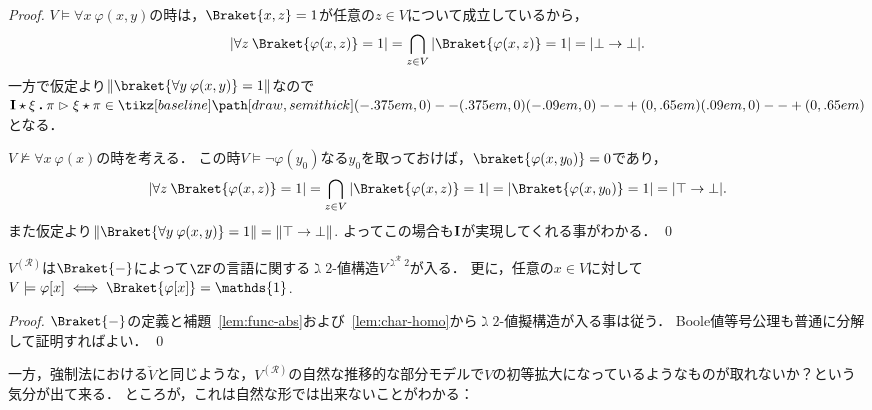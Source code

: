 \documentclass[realisability.tex]{subfiles}
\begin{document}
\begin{proof}
 $V \models \forall x \: \varphi(x, y)$の時は，$\Braket{x, z} = 1$が任意の$z \in V$について成立しているから，
 \[
 \left|\forall z \: \Braket{\varphi(x,z)} = 1\right| = \bigcap_{z \in V} \left|\Braket{\varphi(x, z)} = 1\right| = | \bot \to \bot |.
 \]
 一方で仮定より$\|\braket{\forall y \: \varphi(x, y)} = 1\|$なので$\comb{I} \cons \xi \push \pi \reds \xi \cons \pi \in \pole$となる．

 $V \not\models \forall x \: \varphi(x)$の時を考える．
 この時$V \models \neg \varphi(y_0)$なる$y_0$を取っておけば，$\braket{\varphi(x, y_0)} = 0$であり，
 \[
 \left|\forall z \: \Braket{\varphi(x,z)} = 1\right| = \bigcap_{z \in V} \left|\Braket{\varphi(x, z)} = 1\right| = |\Braket{\varphi(x, y_0)} = 1| = | \top \to \bot |.
 \]
 また仮定より$\|\Braket{\forall y\: \varphi(x, y)} = 1\| = \|\top \to \bot\|$.
 よってこの場合も$\mathsf{\mathbf{I}}$が実現してくれる事がわかる． \qed
\end{proof}

\begin{corollary}
 $V^{(\mathcal{R})}$は$\Braket{-}$によって$\ZF$の言語に関する$\gimel 2$-値構造$V^{\gimel^{\mathcal{R}} 2}$が入る．
 更に，任意の$x \in V$に対して$V \models \varphi[x] \iff \Braket{\varphi[x]} = \mathds{1}$.
\end{corollary}
\begin{proof}
 $\Braket{-}$の定義と補題~\ref{lem:func-abs}および~\ref{lem:char-homo}から$\gimel 2$-値擬構造が入る事は従う．
 Boole値等号公理も普通に分解して証明すればよい． \qed
\end{proof}

一方，強制法における$\check{V}$と同じような，$V^{(\mathcal{R})}$の自然な推移的な部分モデルで$V$の初等拡大になっているようなものが取れないか？という気分が出て来る．
ところが，これは自然な形では出来ないことがわかる：
\end{document}
